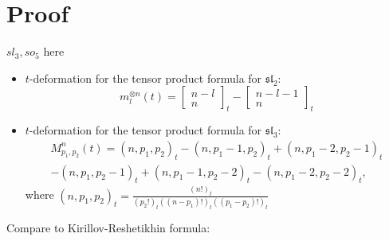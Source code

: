 \documentclass[12pt]{iopart}
\begin{document}
\section{Proof}
\label{sec:proof}
$sl_{3}, so_{5}$ here
  \begin{itemize}
  \item $t$-deformation for the tensor product formula for $\mathfrak{sl}_{2}$:
    \begin{equation}
      \label{eq:8}
      m^{\otimes n}_{l}(t)=\left[\begin{array}{c}n-l\\n\end{array}\right]_{t}-      \left[\begin{array}{c}n-l-1\\n\end{array}\right]_{t}
    \end{equation}
  \item  $t$-deformation for the tensor product formula for $\mathfrak{sl}_{3}$:
    \begin{equation}
      \label{eq:9}
      \begin{array}{l}
      M^{n}_{p_{1},p_{2}}(t)=(n,p_{1},p_{2})_{t}-(n,p_{1}-1,p_{2})_{t}+(n,p_{1}-2,p_{2}-1)_{t}\\-(n,p_{1},p_{2}-1)_{t}+(n,p_{1}-1,p_{2}-2)_{t}-(n,p_{1}-2,p_{2}-2)_{t},        
      \end{array}
    \end{equation}
    where $(n,p_{1},p_{2})_{t}=\frac{(n!)_{t}}{(p_{2}!)_{t}((n-p_{1})!)_{t}((p_{1}-p_{2})!)_{t}}$
  \end{itemize}

Compare to Kirillov-Reshetikhin formula:
\end{document}
